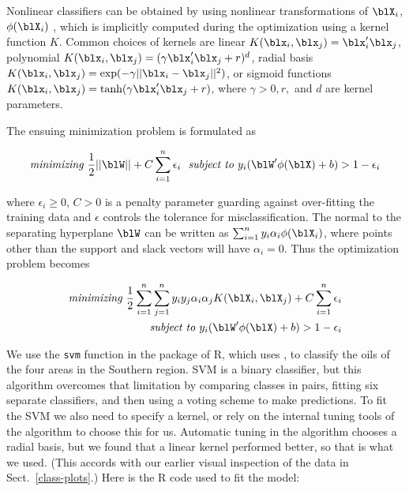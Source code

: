 Nonlinear classifiers can be obtained by using nonlinear
transformations of $\blX_i$, $\phi(\blX_i)$ \cite{BGV92}, which is
implicitly computed during the optimization using a kernel function
$K$. Common choices of kernels are linear
$K(\blx_i,\blx_j)=\blx_i'\blx_j$, polynomial
$K(\blx_i,\blx_j)=(\gamma\blx_i'\blx_j+r)^d$, radial basis
$K(\blx_i,\blx_j)=\exp(-\gamma||\blx_i-\blx_j||^2)$, or sigmoid
functions $K(\blx_i,\blx_j)=\mbox{tanh}(\gamma\blx_i'\blx_j+r)$, where
$\gamma>0, r,$ and $d$ are kernel parameters.


The ensuing minimization problem is formulated as

\[
\mbox{\em minimizing } \frac{1}{2}||\blW|| + C\sum_{i=1}^n \epsilon_i ~~ \mbox{\em subject to } 
y_i(\blW'\phi(\blX)+b)>1-\epsilon_i
\]

\noindent where $\epsilon_i\geq 0$, $C>0$ is a penalty parameter guarding 
against over-fitting the training data and $\epsilon$ controls the
tolerance for misclassification. The normal to the separating
hyperplane $\blW$ can be written as $\sum_{i=1}^{n}
y_i\alpha_i{\phi(\blX_i)}$, where points other than the support and
slack vectors will have $\alpha_i=0$.  Thus the optimization problem
becomes

\begin{eqnarray*}
\mbox{\em minimizing } \frac{1}{2} \sum_{i=1}^n\sum_{j=1}^n y_iy_j\alpha_i\alpha_jK(\blX_i,\blX_j)+C\sum_{i=1}^n \epsilon_i \\ ~~~~~~~~~~~\mbox{\em subject to } 
y_i(\blW'\phi(\blX)+b)>1-\epsilon_i
\end{eqnarray*}


We use the {\tt svm} function in the  package
\cite{DHLMW} of R, which uses  \cite{CL}, to classify
the oils of the four areas in the Southern region.  SVM is a binary
classifier, but this algorithm overcomes that limitation by comparing
classes in pairs, fitting six separate classifiers, and then using a
voting scheme to make predictions. To fit the SVM we also need to
specify a kernel, or rely on the internal tuning tools of the
algorithm to choose this for us.  Automatic tuning in the algorithm
chooses a radial basis, but we found that a linear kernel performed
better, so that is what we used. (This accords with our earlier visual
inspection of the data in Sect.~\ref{class-plots}.)  Here is the R
code used to fit the model:

